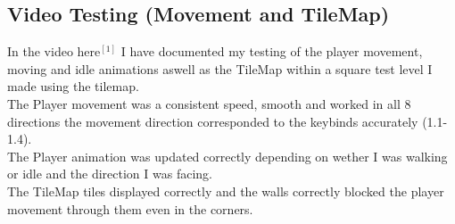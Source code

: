 \documentclass{article}
\begin{document}
        \subsection{Video Testing (Movement and TileMap)}
        In the video here$^{[1]}$ I have documented my testing of the player movement, moving and idle animations aswell as the TileMap within a square test level I made using the tilemap.\\
        The Player movement was a consistent speed, smooth and worked in all 8 directions the movement direction corresponded to the keybinds accurately (1.1-1.4).\\
        The Player animation was updated correctly depending on wether I was walking or idle and the direction I was facing.\\
        The TileMap tiles displayed correctly and the walls correctly blocked the player movement through them even in the corners.\\
\end{document}
